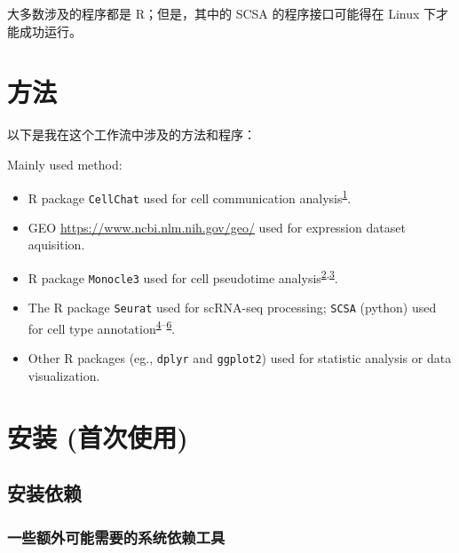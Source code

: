 \documentclass[
]{article}
\providecommand{\tightlist}{%
  \setlength{\itemsep}{0pt}\setlength{\parskip}{0pt}}
\begin{document}
大多数涉及的程序都是 R；但是，其中的 SCSA 的程序接口可能得在 Linux 下才能成功运行。

\hypertarget{ux65b9ux6cd5}{%
\section{方法}\label{ux65b9ux6cd5}}

以下是我在这个工作流中涉及的方法和程序：

Mainly used method:

\begin{itemize}
\tightlist
\item
  R package \texttt{CellChat} used for cell communication analysis\textsuperscript{\protect\hyperlink{ref-InferenceAndAJinS2021}{1}}.
\item
  GEO \url{https://www.ncbi.nlm.nih.gov/geo/} used for expression dataset aquisition.
\item
  R package \texttt{Monocle3} used for cell pseudotime analysis\textsuperscript{\protect\hyperlink{ref-ReversedGraphQiuX2017}{2},\protect\hyperlink{ref-TheDynamicsAnTrapne2014}{3}}.
\item
  The R package \texttt{Seurat} used for scRNA-seq processing; \texttt{SCSA} (python) used for cell type annotation\textsuperscript{\protect\hyperlink{ref-IntegratedAnalHaoY2021}{4}--\protect\hyperlink{ref-ScsaACellTyCaoY2020}{6}}.
\item
  Other R packages (eg., \texttt{dplyr} and \texttt{ggplot2}) used for statistic analysis or data visualization.
\end{itemize}

\hypertarget{ux5b89ux88c5-ux9996ux6b21ux4f7fux7528}{%
\section{安装 (首次使用)}\label{ux5b89ux88c5-ux9996ux6b21ux4f7fux7528}}

\hypertarget{ux5b89ux88c5ux4f9dux8d56}{%
\subsection{安装依赖}\label{ux5b89ux88c5ux4f9dux8d56}}

\hypertarget{ux4e00ux4e9bux989dux5916ux53efux80fdux9700ux8981ux7684ux7cfbux7edfux4f9dux8d56ux5de5ux5177}{%
\subsubsection{一些额外可能需要的系统依赖工具}\label{ux4e00ux4e9bux989dux5916ux53efux80fdux9700ux8981ux7684ux7cfbux7edfux4f9dux8d56ux5de5ux5177}}
\end{document}
